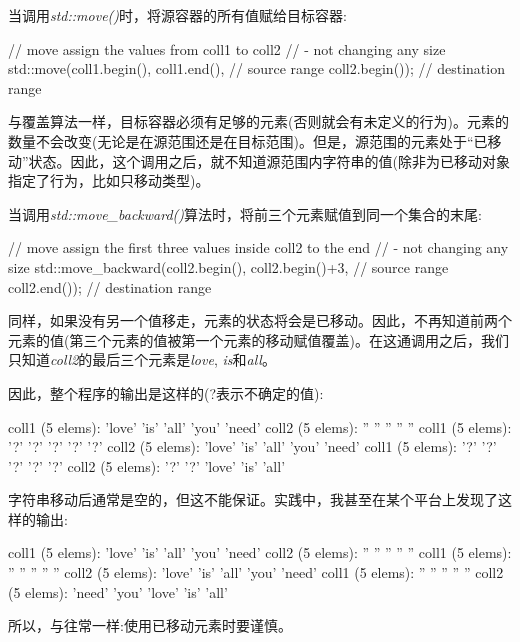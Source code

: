 当调用\textit{std::move()}时，将源容器的所有值赋给目标容器:

\begin{cppcode}
// move assign the values from coll1 to coll2
// - not changing any size
std::move(coll1.begin(), coll1.end(), // source range
		  coll2.begin()); // destination range
\end{cppcode}

与覆盖算法一样，目标容器必须有足够的元素(否则就会有未定义的行为)。元素的数量不会改变(无论是在源范围还是在目标范围)。但是，源范围的元素处于“已移动”状态。因此，这个调用之后，就不知道源范围内字符串的值(除非为已移动对象指定了行为，比如只移动类型)。

当调用\textit{std::move_backward()}算法时，将前三个元素赋值到同一个集合的末尾:

\begin{cppcode}
// move assign the first three values inside coll2 to the end
// - not changing any size
std::move_backward(coll2.begin(), coll2.begin()+3, // source range
				   coll2.end()); // destination range
\end{cppcode}

同样，如果没有另一个值移走，元素的状态将会是已移动。因此，不再知道前两个元素的值(第三个元素的值被第一个元素的移动赋值覆盖)。在这通调用之后，我们只知道\textit{coll2}的最后三个元素是\textit{love}, \textit{is}和\textit{all}。

因此，整个程序的输出是这样的(?表示不确定的值):

\begin{outputcode}
coll1 (5 elems): 'love' 'is' 'all' 'you' 'need'
coll2 (5 elems): '' '' '' '' ''
coll1 (5 elems): '?' '?' '?' '?' '?'
coll2 (5 elems): 'love' 'is' 'all' 'you' 'need'
coll1 (5 elems): '?' '?' '?' '?' '?'
coll2 (5 elems): '?' '?' 'love' 'is' 'all'
\end{outputcode}

字符串移动后通常是空的，但这不能保证。实践中，我甚至在某个平台上发现了这样的输出:

\begin{outputcode}
coll1 (5 elems): 'love' 'is' 'all' 'you' 'need'
coll2 (5 elems): '' '' '' '' ''
coll1 (5 elems): '' '' '' '' ''
coll2 (5 elems): 'love' 'is' 'all' 'you' 'need'
coll1 (5 elems): '' '' '' '' ''
coll2 (5 elems): 'need' 'you' 'love' 'is' 'all'
\end{outputcode}


所以，与往常一样:使用已移动元素时要谨慎。

